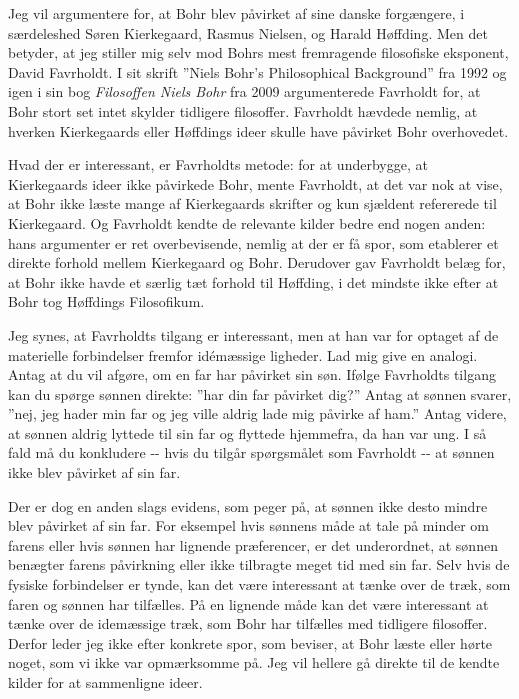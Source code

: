 \documentclass[12pt]{article}
\begin{document}
Jeg vil argumentere for, at Bohr blev påvirket af sine danske
forgængere, i særdeleshed Søren Kierkegaard, Rasmus Nielsen, og Harald
Høffding. Men det betyder, at jeg stiller mig selv mod Bohrs mest
fremragende filosofiske eksponent, David Favrholdt. I sit skrift ''Niels
Bohr's Philosophical Background'' fra 1992 og igen i sin bog
\emph{Filosoffen Niels Bohr} fra 2009 argumenterede Favrholdt for, at
Bohr stort set intet skylder tidligere filosoffer. Favrholdt hævdede
nemlig, at hverken Kierkegaards eller Høffdings ideer skulle have
påvirket Bohr overhovedet.

Hvad der er interessant, er Favrholdts metode: for at underbygge, at
Kierkegaards ideer ikke påvirkede Bohr, mente Favrholdt, at det var nok
at vise, at Bohr ikke læste mange af Kierkegaards skrifter og kun
sjældent refererede til Kierkegaard. Og Favrholdt kendte de relevante
kilder bedre end nogen anden: hans argumenter er ret overbevisende,
nemlig at der er få spor, som etablerer et direkte forhold mellem
Kierkegaard og Bohr. Derudover gav Favrholdt belæg for, at Bohr ikke
havde et særlig tæt forhold til Høffding, i det mindste ikke efter at
Bohr tog Høffdings Filosofikum.

Jeg synes, at Favrholdts tilgang er interessant, men at han var for
optaget af de materielle forbindelser fremfor idémæssige ligheder. Lad
mig give en analogi. Antag at du vil afgøre, om en far har påvirket sin
søn. Ifølge Favrholdts tilgang kan du spørge sønnen direkte: ''har din
far påvirket dig?'' Antag at sønnen svarer, ''nej, jeg hader min far og
jeg ville aldrig lade mig påvirke af ham.'' Antag videre, at sønnen
aldrig lyttede til sin far og flyttede hjemmefra, da han var ung. I så
fald må du konkludere -\/- hvis du tilgår spørgsmålet som Favrholdt -\/-
at sønnen ikke blev påvirket af sin far.

Der er dog en anden slags evidens, som peger på, at sønnen ikke desto
mindre blev påvirket af sin far. For eksempel hvis sønnens måde at tale
på minder om farens eller hvis sønnen har lignende præferencer, er det
underordnet, at sønnen benægter farens påvirkning eller ikke tilbragte
meget tid med sin far. Selv hvis de fysiske forbindelser er tynde, kan
det være interessant at tænke over de træk, som faren og sønnen har
tilfælles. På en lignende måde kan det være interessant at tænke over de
idemæssige træk, som Bohr har tilfælles med tidligere filosoffer. Derfor
leder jeg ikke efter konkrete spor, som beviser, at Bohr læste eller
hørte noget, som vi ikke var opmærksomme på. Jeg vil hellere gå direkte
til de kendte kilder for at sammenligne ideer.
\end{document}
